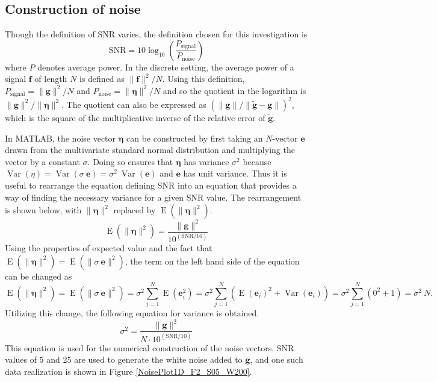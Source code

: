 \documentclass[12pt]{article}
\newcommand{\gVec}{\mathbf{g}}	%
\newcommand{\gnoiseVec}{\widetilde{\mathbf{g}}}	%
\newcommand{\noise}{\eta}	%
\newcommand{\noiseSD}{\sigma}	%
\newcommand{\noiseVec}{\bm{\noise}}	%
\DeclareMathOperator{\Var}{Var}	%
\DeclareMathOperator{\E}{E}	%
\begin{document}
\subsection{Construction of noise} \label{sec:Construction of noise}

Though the definition of SNR varies, the definition chosen for this investigation is
\begin{equation}
\label{eq:SNR}
\text{SNR} = 10\log_{10}\left(\frac{P_{\text{signal}}}{P_{\text{noise}}}\right)
\end{equation}
where $P$ denotes average power. In the discrete setting, the average power of a signal $\mathbf{f}$ of length $N$ is defined as $\|\mathbf{f}\|^2/N$. Using this definition, $P_{\text{signal}} = \|\gVec\|^2/N$ and $P_{\text{noise}} = \|\noiseVec\|^2/N$ and so the quotient in the logarithm is $\|\gVec\|^2/\|\noiseVec\|^2$. The quotient can also be expressed as $(\|\gVec\|/\|\gnoiseVec - \gVec\|)^2$, which is the square of the multiplicative inverse of the relative error of $\gnoiseVec$. \par
In MATLAB, the noise vector $\noiseVec$ can be constructed by first taking an $N$-vector $\mathbf{e}$ drawn from the multivariate standard normal distribution and multiplying the vector by a constant $\noiseSD$. Doing so ensures that $\noiseVec$ has variance $\noiseSD^2$ because $\Var(\noise) = \Var(\noiseSD\:\mathbf{e}) = \noiseSD^2\:\Var(\mathbf{e})$ and $\mathbf{e}$ has unit variance. Thus it is useful to rearrange the equation defining SNR into an equation that provides a way of finding the necessary variance for a given SNR value. The rearrangement is shown below, with $\|\noiseVec\|^2$ replaced by $\E(\|\noiseVec\|^2)$.
\[\E(\|\noiseVec\|^2) = \frac{\|\gVec\|^2}{10^{(\text{SNR}/10)}}\]
Using the properties of expected value and the fact that $\E(\|\noiseVec\|^2) = \E(\|\noiseSD\:\mathbf{e}\|^2)$, the term on the left hand side of the equation can be changed as
\[\E(\|\noiseVec\|^2) = \E(\|\noiseSD\:\mathbf{e}\|^2) = \noiseSD^2 \sum_{j=1}^N \E(\mathbf{e}_i^2) = \noiseSD^2 \sum_{j=1}^N \left(\E(\mathbf{e}_i)^2 + \Var(\mathbf{e}_i)\right) = \noiseSD^2 \sum_{j=1}^N \left(0^2 + 1\right) = \noiseSD^2\:N.\]
Utilizing this change, the following equation for variance is obtained.
\begin{equation}
\label{eq:Var}
\noiseSD^2 = \frac{\|\gVec\|^2}{N \cdot 10^{(\text{SNR}/10)}}
\end{equation}
This equation is used for the numerical construction of the noise vectors. SNR values of 5 and 25 are used to generate the white noise added to $\gVec$, and one such data realization is shown in Figure \ref{NoisePlot1D_F2_S05_W200}. \par
\end{document}
